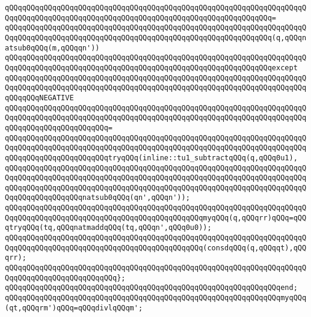 \verb|qQQqqQQqqQQqqQQqqQQqqQQqqQQqqQQqqQQqqQQqqQQqqQQqqQQqqQQqqQQqqQQqqQQqqQQqqQQqqQQqqQQqqQQqqQQqqQQqqQQqqQQqqQQqqQQqqQQqqQQqqQQqqQQqqQQq=|\newline
\verb|qQQqqQQqqQQqqQQqqQQqqQQqqQQqqQQqqQQqqQQqqQQqqQQqqQQqqQQqqQQqqQQqqQQqqQQqqQQqqQQqqQQqqQQqqQQqqQQqqQQqqQQqqQQqqQQqqQQqqQQqqQQqqQQqqQQq(q,qQQqnatsub0qQQq(m,qQQqqn'))|\newline
\verb|qQQqqQQqqQQqqQQqqQQqqQQqqQQqqQQqqQQqqQQqqQQqqQQqqQQqqQQqqQQqqQQqqQQqqQQqqQQqqQQqqQQqqQQqqQQqqQQqqQQqqQQqqQQqqQQqqQQqqQQqqQQqqQQqqQQqexcept|\newline
\verb|qQQqqQQqqQQqqQQqqQQqqQQqqQQqqQQqqQQqqQQqqQQqqQQqqQQqqQQqqQQqqQQqqQQqqQQqqQQqqQQqqQQqqQQqqQQqqQQqqQQqqQQqqQQqqQQqqQQqqQQqqQQqqQQqqQQqqQQqqQQqqQQqqQQqNEGATIVE|\newline
\verb|qQQqqQQqqQQqqQQqqQQqqQQqqQQqqQQqqQQqqQQqqQQqqQQqqQQqqQQqqQQqqQQqqQQqqQQqqQQqqQQqqQQqqQQqqQQqqQQqqQQqqQQqqQQqqQQqqQQqqQQqqQQqqQQqqQQqqQQqqQQqqQQqqQQqqQQqqQQqqQQqqQQq=|\newline
\verb|qQQqqQQqqQQqqQQqqQQqqQQqqQQqqQQqqQQqqQQqqQQqqQQqqQQqqQQqqQQqqQQqqQQqqQQqqQQqqQQqqQQqqQQqqQQqqQQqqQQqqQQqqQQqqQQqqQQqqQQqqQQqqQQqqQQqqQQqqQQqqQQqqQQqqQQqqQQqqQQqqQQqtryqQQq(inline::tu1_subtractqQQq(q,qQQq0u1),|\newline
\verb|qQQqqQQqqQQqqQQqqQQqqQQqqQQqqQQqqQQqqQQqqQQqqQQqqQQqqQQqqQQqqQQqqQQqqQQqqQQqqQQqqQQqqQQqqQQqqQQqqQQqqQQqqQQqqQQqqQQqqQQqqQQqqQQqqQQqqQQqqQQqqQQqqQQqqQQqqQQqqQQqqQQqqQQqqQQqqQQqqQQqqQQqqQQqqQQqqQQqqQQqqQQqqQQqqQQqqQQqqQQqqQQqqQQqnatsub0qQQq(qn',qQQqn'));|\newline
\newline
\verb|qQQqqQQqqQQqqQQqqQQqqQQqqQQqqQQqqQQqqQQqqQQqqQQqqQQqqQQqqQQqqQQqqQQqqQQqqQQqqQQqqQQqqQQqqQQqqQQqqQQqqQQqqQQqqQQqqQQqmyqQQq(q,qQQqrr)qQQq=qQQqtryqQQq(tq,qQQqnatmaddqQQq(tq,qQQqn',qQQq0u0));|\newline
\newline
\verb|qQQqqQQqqQQqqQQqqQQqqQQqqQQqqQQqqQQqqQQqqQQqqQQqqQQqqQQqqQQqqQQqqQQqqQQqqQQqqQQqqQQqqQQqqQQqqQQqqQQqqQQqqQQqqQQqqQQq(consdqQQq(q,qQQqqt),qQQqrr);|\newline
\verb|qQQqqQQqqQQqqQQqqQQqqQQqqQQqqQQqqQQqqQQqqQQqqQQqqQQqqQQqqQQqqQQqqQQqqQQqqQQqqQQqqQQqqQQqqQQqqQQq};|\newline
\verb|qQQqqQQqqQQqqQQqqQQqqQQqqQQqqQQqqQQqqQQqqQQqqQQqqQQqqQQqqQQqqQQqend;|\newline
\newline
\verb|qQQqqQQqqQQqqQQqqQQqqQQqqQQqqQQqqQQqqQQqqQQqqQQqqQQqqQQqqQQqqQQqmyqQQq(qt,qQQqrm')qQQq=qQQqdivlqQQqm';|\newline
